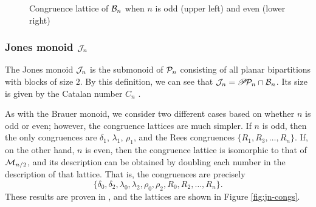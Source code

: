 \begin{figure}[p]
  \caption[Congruence lattice of $\Brau_n$]{Congruence lattice of $\Brau_n$ when
    $n$ is odd (upper left) and even (lower right)}
  \label{fig:bn-congs}
\end{figure}

\subsubsection{Jones monoid $\mathcal{J}_n$}

The Jones monoid $\mathcal{J}_n$ is the submonoid of $\mathcal{P}_n$ consisting of all planar
bipartitions with blocks of size $2$.  By this definition, we can see that
$\mathcal{J}_n = \mathscr{P}\!\mathcal{P}_n \cap \mathcal{B}_n$.  Its size is given by the Catalan number $C_n$
.

As with the Brauer monoid, we consider two different cases based on whether $n$
is odd or even; however, the congruence lattices are much simpler.  If $n$ is
odd, then the only congruences are $\delta_1$, $\lambda_1$, $\rho_1$, and the
Rees congruences $\{R_1, R_3, \ldots, R_n\}$.  If, on the other hand, $n$ is even,
then the congruence lattice is isomorphic to that of $\mathcal{M}_{n/2}$, and its
description can be obtained by doubling each number in the description of that
lattice.  That is, the congruences are precisely
$$\{\delta_0, \delta_2, \lambda_0, \lambda_2, \rho_0, \rho_2, R_0, R_2, \ldots,
R_n\}.$$
These results are proven in \cite[\S9]{ourpaper}, and the lattices are shown in
Figure \ref{fig:jn-congs}.

